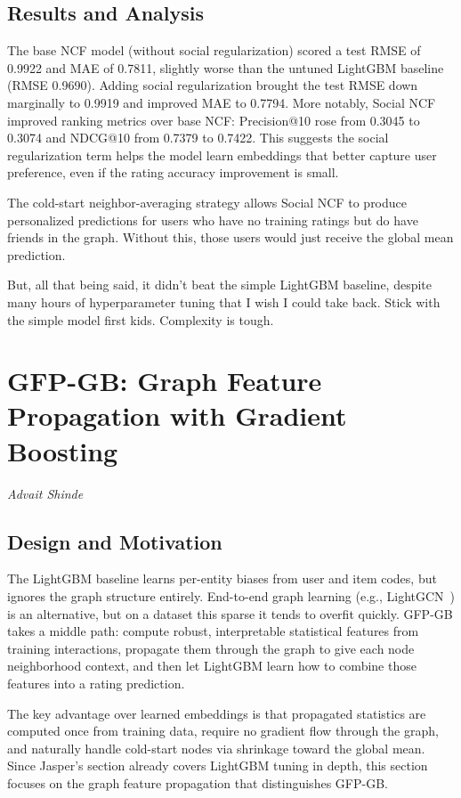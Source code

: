 \documentclass[conference]{IEEEtran}
\begin{document}
\subsection{Results and Analysis}

The base NCF model (without social regularization) scored a test RMSE of 0.9922
and MAE of 0.7811, slightly worse than the untuned LightGBM baseline (RMSE
0.9690). Adding social regularization brought the test RMSE down marginally to
0.9919 and improved MAE to 0.7794. More notably, Social NCF improved ranking
metrics over base NCF: Precision@10 rose from 0.3045 to 0.3074 and NDCG@10
from 0.7379 to 0.7422. This suggests the social regularization term helps the
model learn embeddings that better capture user preference, even if the rating 
accuracy improvement is small.

The cold-start neighbor-averaging strategy allows Social NCF to produce
personalized predictions for users who have no training ratings but do have
friends in the graph. Without this, those users would just receive the global
mean prediction. 

But, all that being said, it didn't beat the simple LightGBM baseline, despite
many hours of hyperparameter tuning that I wish I could take back. Stick with
the simple model first kids. Complexity is tough.

\section{GFP-GB: Graph Feature Propagation with Gradient Boosting}
\label{sec:gfp}

\textit{Advait Shinde}

\subsection{Design and Motivation}

The LightGBM baseline learns per-entity biases from user and item codes, but
ignores the graph structure entirely. End-to-end graph learning (e.g., 
LightGCN~\cite{he2020lightgcn}) is an alternative, but on a dataset this 
sparse it tends to overfit quickly. GFP-GB takes a middle path: compute robust, 
interpretable statistical features from training interactions, propagate them 
through the graph to give each node neighborhood context, and then let LightGBM 
learn how to combine those features into a rating prediction.

The key advantage over learned embeddings is that propagated statistics are 
computed once from training data, require no gradient flow through the graph, 
and naturally handle cold-start nodes via shrinkage toward the global mean.
Since Jasper's section already covers LightGBM tuning in depth, this section 
focuses on the graph feature propagation that distinguishes GFP-GB.
\end{document}
